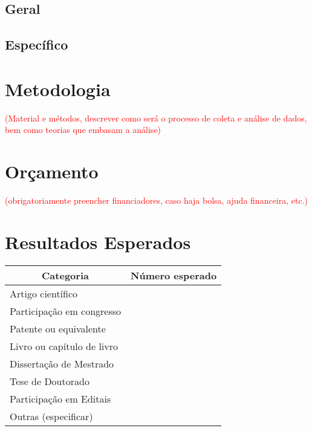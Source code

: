 \documentclass[12pt,a4paper,oneside]{book}
\begin{document}
\section{Geral}
\section{Espec\'{i}fico}
\pagebreak

\chapter{Metodologia}
\textcolor{red}{(Material e m\'{e}todos, descrever como ser\'{a} o processo de coleta e an\'{a}lise de dados, bem como teorias que embasam a an\'{a}lise)}
\pagebreak

\chapter{Or\c{c}amento}
\textcolor{red}{(obrigatoriamente preencher financiadores, caso haja bolsa, ajuda financeira, etc.)}
\pagebreak

\chapter{Resultados Esperados}
\begin{center}
    \begin{tabular}{|l|c|}
        \hline
        \multicolumn{1}{|c|}{Categoria} & \multicolumn{1}{|c|}{N\'{u}mero esperado} \\ \hline
        Artigo cient\'{i}fico &  \\ \hline
        Participa\c{c}\~{a}o em congresso & \\ \hline
        Patente ou equivalente & \\ \hline
        Livro ou cap\'{i}tulo de livro & \\ \hline
        Disserta\c{c}\~{a}o de Mestrado & \\ \hline
        Tese de Doutorado & \\ \hline
        Participa\c{c}\~{a}o em Editais & \\ \hline
        Outras (especificar) & \\ \hline
    \end{tabular}
\end{center}
\pagebreak
\end{document}
